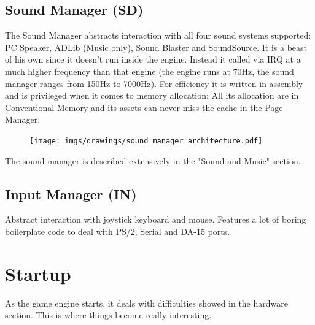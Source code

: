 \documentclass[book.tex]{subfiles}
\begin{document}
\subsection{Sound Manager (SD)}
The Sound Manager abstracts interaction with all four sound systems supported: PC Speaker, ADLib (Music only), Sound Blaster and SoundSource. It is a beast of his own since it doesn't run inside the engine. Instead it called via IRQ at a much higher frequency than that engine (the engine runs at 70Hz, the sound manager ranges from 150Hz to 7000Hz). For efficiency it is written in assembly and is privileged when it comes to memory allocation: All its allocation are in Conventional Memory and its assets can never miss the cache in the Page Manager.\\
 \par
\begin{figure}[H]
\centering
 \texttt{[image: imgs/drawings/sound\_manager\_architecture.pdf]}
 \end{figure}
 \par
The sound manager is described extensively in the "Sound and Music" section.

















\subsection{Input Manager (IN)}
Abstract interaction with joystick keyboard and mouse. Features a lot of boring boilerplate code to deal with PS/2, Serial and DA-15 ports.
















\section{Startup}
As the game engine starts, it deals with difficulties showed in the hardware section. This is where things become really interesting.
\end{document}
